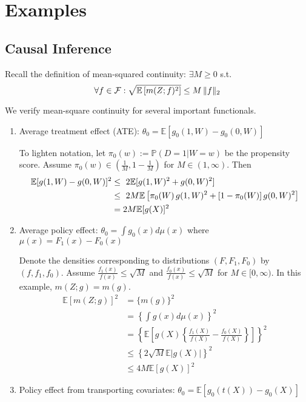 \section{Examples}

\subsection{Causal Inference}\label{sec:continuity}

Recall the definition of mean-squared continuity: $\exists M\geq 0$ s.t.
$$
\forall f\in {\mathcal F}: \sqrt{\mathbb{E}\left[m(Z;f)^2\right]} \leq M\, \|f\|_2 
$$

We verify mean-square continuity for several important functionals.
\begin{enumerate}
    \item Average treatment effect (ATE): $\theta_0=\mathbb{E}[g_0(1,W)-g_0(0,W)]$
    
    To lighten notation, let $\pi_0(w):=\mathbb{P}(D=1|W=w)$ be the propensity score.
    Assume $\pi_0(w)\in \left(\frac{1}{M},1-\frac{1}{M}\right)$ for $M\in(1,\infty)$. Then
    \begin{align}
        \mathbb{E}[g(1, W) - g(0, W)]^2&\leq~ 2\mathbb{E}[g(1,W)^2 + g(0, W)^2]\\
&\leq~ 2M \mathbb{E}\left[\pi_0(W)\, g(1,W)^2 + [1-\pi_0(W)]\, g(0, W)^2\right] \\
&= 2M \mathbb{E}[g(X)]^2
    \end{align}
    
    \item Average policy effect: $\theta_0=\int g_0(x)d\mu(x)$ where $\mu(x)=F_1(x)-F_0(x)$
    
    Denote the densities corresponding to distributions $(F,F_1,F_0)$ by $(f,f_1,f_0)$. Assume $\frac{f_1(x)}{f(x)}\leq \sqrt{M}$ and $\frac{f_0(x)}{f(x)}\leq \sqrt{M}$ for $M\in[0,\infty)$. In this example, $m(Z;g)=m(g)$.
    \begin{align}
        \mathbb{E}[m(Z;g)]^2&=\{m(g)\}^2 \\
        &=\left\{\int g(x)d\mu(x)\right\}^2 \\
        &=\left\{\mathbb{E}\left[ g(X)\left\{\frac{f_1(X)}{f(X)}-\frac{f_0(X)}{f(X)}\right\} \right]\right\}^2 \\
        &\leq \left\{2 \sqrt{M} \mathbb{E}|g(X)|\right\}^2 \\
        &\leq 4M \mathbb{E}[g(X)]^2
    \end{align}
    
    \item Policy effect from transporting covariates: $\theta_0=\mathbb{E}[g_0(t(X))-g_0(X)]$
    

\end{enumerate}
